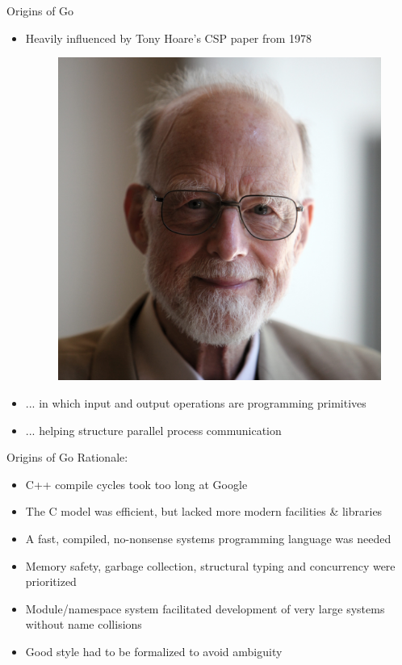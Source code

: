 \documentclass[pdf,xcolor=dvipsnames,noparindent]{beamer}
\begin{document}
\begin{frame}{Origins of Go}
  \pause
  \begin{itemize}
  \item Heavily influenced by Tony Hoare's CSP paper from 1978
    \begin{figure}
      \centering
      \includegraphics[scale = 0.02]{images/hoare.jpg}
    \end{figure}
    \pause
  \item ... in which input and output operations are programming primitives
    \pause
  \item ... helping structure parallel process communication
  \end{itemize}
  
\end{frame}

\begin{frame}{Origins of Go}
  \pause
  Rationale:
  \pause
  \begin{itemize}
  \item C++ compile cycles took too long at Google
    \pause
  \item The C model was efficient, but lacked more modern facilities \& libraries
    \pause
  \item A fast, compiled, no-nonsense systems programming language was needed
    \pause
  \item Memory safety, garbage collection, structural typing and concurrency were prioritized
    \pause
  \item Module/namespace system facilitated development of very large systems without name collisions
    \pause
  \item Good style had to be formalized to avoid ambiguity
  \end{itemize}
\end{frame}
\end{document}
